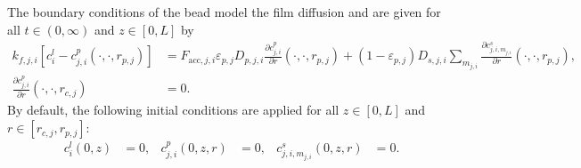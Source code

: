 The boundary conditions of the bead model the film diffusion and are given for all ${t \in (0,\infty)}$ and $z \in [0,L]$ by
\begin{align}
	k_{f,j,i}\left[ c^l_i - c^p_{j,i}(\cdot, \cdot, r_{p,j}) \right] &= F_{\text{acc},j,i} \varepsilon_{p,j} D_{p,j,i} \frac{\partial c^p_{j,i}}{\partial r}(\cdot, \cdot, r_{p,j}) + \left( 1 - \varepsilon_{p,j}\right) D_{s,j,i} \sum_{m_{j,i}} \frac{\partial c^s_{j,i,m_{j,i}}}{\partial r}(\cdot, \cdot, r_{p,j}), \label{eq:BCBeadIn} \\
	\frac{\partial c^p_{j,i}}{\partial r}(\cdot, \cdot, r_{c,j}) &= 0. \label{eq:BCBeadCenter}
\end{align}
By default, the following initial conditions are applied for all $z \in [0,L]$ and $r \in \left[r_{c,j}, r_{p,j}\right]$:
\begin{align}
	c^l_i(0, z) &= 0, & c^p_{j,i}(0, z, r) &= 0, & c^s_{j,i,m_{j,i}}(0,z,r) &= 0. \label{eq:InitialConditions}
\end{align}

